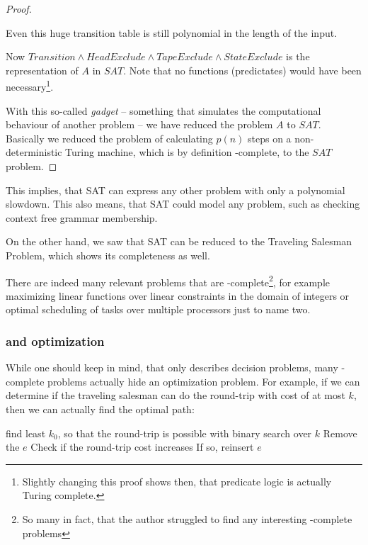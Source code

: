 \begin{proof}
\begin{itemize}
			Even this huge transition table is still polynomial in the length of the input.
	\end{itemize}

	Now $Transition\wedge HeadExclude \wedge TapeExclude \wedge StateExclude$ 
	is the representation of $A$ in $SAT$. Note that no functions (predictates) would have 
	been necessary\footnote{Slightly changing this proof shows then, that predicate 
	logic is actually Turing complete.}.

	With this so-called \emph{gadget} -- something that simulates the 
	computational behaviour of another problem -- we have reduced the problem $A$ 
	to $SAT$. Basically we reduced the problem of calculating $p(n)$ steps on a 
	non-deterministic Turing machine, which is by definition \NPTIME-complete, 
	to the $SAT$ problem.
\end{proof}
This implies, that SAT can express any other \NPTIME problem with only a 
polynomial slowdown. This also means, that SAT could model any \PTIME 
problem, such as checking context free grammar membership.

On the other hand, we saw that SAT can be reduced to the Traveling Salesman 
Problem, which shows its completeness as well.

There are indeed many relevant problems that are \NPTIME-complete\footnote{So 
many in fact, that the author struggled to find any interesting \PTIME-complete
problems}, for example maximizing linear functions over linear constraints in
the domain of integers or optimal scheduling of tasks over multiple processors
just to name two.

\subsubsection{\NPTIME and optimization}
\label{np-opti}
While one should keep in mind, that \NPTIME only
describes decision problems, many \NPTIME-complete
problems actually hide an optimization problem. For
example, if we can determine if the traveling
salesman can do the round-trip with cost of at most
$k$, then we can actually find the optimal path:

\begin{algorithmic}[1]
	\State find least $k_0$, so that the round-trip is possible with binary search over $k$
		\State Remove the $e$
		\State Check if the round-trip cost increases
		\State If so, reinsert $e$
	\EndFor
\end{algorithmic}

